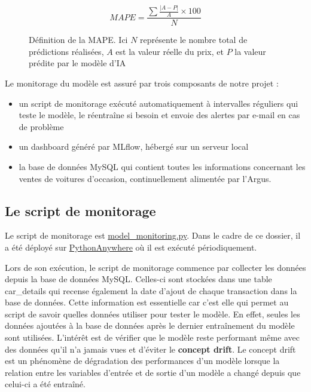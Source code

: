 \documentclass[french]{article}
\begin{document}
    \begin{figure}[h!]
        \begin{equation}MAPE = \frac {\sum \frac{\lvert A-P \rvert}{A} \times 100}{N}  \end{equation}
        \centering
        \caption{Définition de la MAPE. Ici $N$ représente le nombre total de prédictions réalisées, $A$ est la valeur réelle du prix, et $P$ la valeur prédite par le modèle d'IA}
        \centering
    \end{figure}

    Le monitorage du modèle est assuré par trois composants de notre projet :
    \begin{itemize}
        \item un script de monitorage exécuté automatiquement à intervalles réguliers qui teste le modèle, le réentraîne si besoin et envoie des alertes par e-mail en cas de problème
        \item un dashboard généré par MLflow, hébergé sur un serveur local
        \item la base de données MySQL qui contient toutes les informations concernant les ventes de voitures d'occasion, continuellement alimentée par l'Argus.
    \end{itemize}

    \subsection{Le script de monitorage}

    Le script de monitorage est \href{https://github.com/vinpap/iargus/blob/981ff9fa80fa4b729df37a93b5966d41e86d6966/iargus/model_monitoring.py}{model\_monitoring.py}. Dans le cadre de ce dossier, il a été déployé sur \href{https://www.pythonanywhere.com/}{PythonAnywhere} où il est exécuté périodiquement.

    Lors de son exécution, le script de monitorage commence par collecter les données depuis la base de données MySQL. Celles-ci sont stockées dans une table car\_details qui recense également la date d'ajout de chaque transaction dans la base de données. Cette information est essentielle car c'est elle qui permet au script de savoir quelles données utiliser pour tester le modèle. En effet, seules les données ajoutées à la base de données après le dernier entraînement du modèle sont utilisées. L'intérêt est de vérifier que le modèle reste performant même avec des données qu'il n'a jamais vues et d'éviter le \textbf{concept drift}. Le concept drift est un phénomène de dégradation des performances d'un modèle lorsque la relation entre les variables d'entrée et de sortie d'un modèle a changé depuis que celui-ci a été entraîné. 
    
\end{document}

